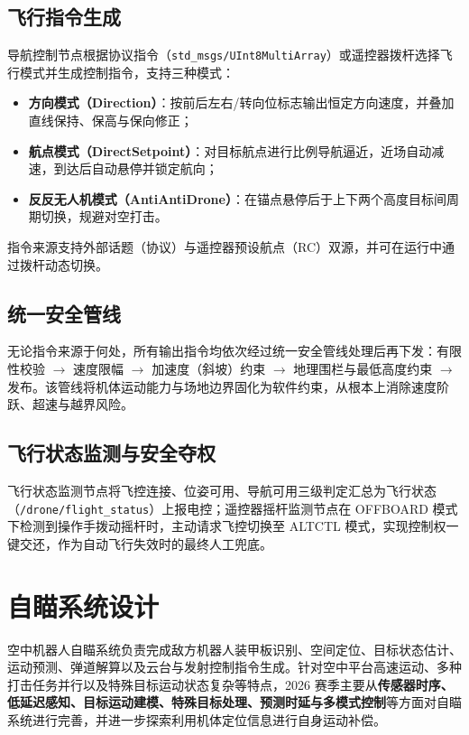 \subsection{飞行指令生成}
导航控制节点根据协议指令（\lstinline{std_msgs/UInt8MultiArray}）或遥控器拨杆选择飞行模式并生成控制指令，支持三种模式：
\begin{itemize}
    \item \textbf{方向模式（Direction）}：按前后左右/转向位标志输出恒定方向速度，并叠加直线保持、保高与保向修正；
    \item \textbf{航点模式（DirectSetpoint）}：对目标航点进行比例导航逼近，近场自动减速，到达后自动悬停并锁定航向；
    \item \textbf{反反无人机模式（AntiAntiDrone）}：在锚点悬停后于上下两个高度目标间周期切换，规避对空打击。
\end{itemize}
指令来源支持外部话题（协议）与遥控器预设航点（RC）双源，并可在运行中通过拨杆动态切换。

\subsection{统一安全管线}
无论指令来源于何处，所有输出指令均依次经过统一安全管线处理后再下发：有限性校验 $\rightarrow$ 速度限幅 $\rightarrow$ 加速度（斜坡）约束 $\rightarrow$ 地理围栏与最低高度约束 $\rightarrow$ 发布。该管线将机体运动能力与场地边界固化为软件约束，从根本上消除速度阶跃、超速与越界风险。

\subsection{飞行状态监测与安全夺权}
飞行状态监测节点将飞控连接、位姿可用、导航可用三级判定汇总为飞行状态（\lstinline{/drone/flight_status}）上报电控；遥控器摇杆监测节点在 OFFBOARD 模式下检测到操作手拨动摇杆时，主动请求飞控切换至 ALTCTL 模式，实现控制权一键交还，作为自动飞行失效时的最终人工兜底。

\section{自瞄系统设计}

空中机器人自瞄系统负责完成敌方机器人装甲板识别、空间定位、目标状态估计、运动预测、弹道解算以及云台与发射控制指令生成。针对空中平台高速运动、多种打击任务并行以及特殊目标运动状态复杂等特点，2026 赛季主要从\textbf{传感器时序、低延迟感知、目标运动建模、特殊目标处理、预测时延与多模式控制}等方面对自瞄系统进行完善，并进一步探索利用机体定位信息进行自身运动补偿。

